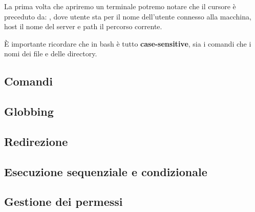 \documentclass[../main.tex]{subfiles}
\begin{document}
La prima volta che apriremo un terminale potremo notare che il cursore è preceduto da: , dove utente sta per il nome dell'utente connesso alla macchina, host il nome del server e path il percorso corrente.

È importante ricordare che in bash è tutto \textbf{case-sensitive}, sia i comandi che i nomi dei file e delle directory.

\subsection{Comandi}


\subsection{Globbing}


\subsection{Redirezione}


\subsection{Esecuzione sequenziale e condizionale}


\pagebreak
\subsection{Gestione dei permessi}

\end{document}
